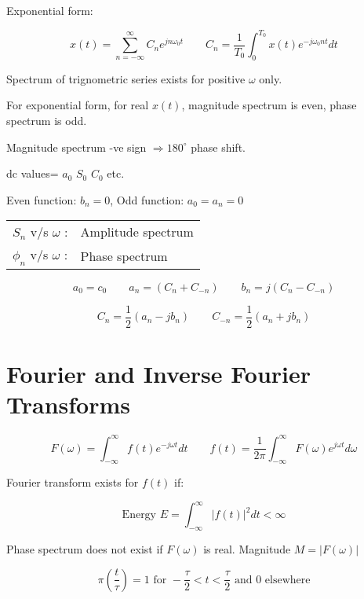 \documentclass[a4paper]{article}
\begin{document}
Exponential form:

\begin{displaymath}
x(t)=
\sum_{n=-\infty}^\infty C_n e^{jn\omega_0 t}
\qquad
C_n=
\frac{1}{T_0}
\int_0^{T_0} x(t) e^{-j\omega_0 nt} dt
\end{displaymath}


Spectrum of trignometric series exists for positive $\omega$ only.

For exponential form, for real $x(t)$, magnitude spectrum is even, phase
spectrum is odd.

Magnitude spectrum -ve sign $\Rightarrow180^\circ$ phase shift.

dc values= $a_0$ $S_0$ $C_0$ etc.

Even function: $b_n=0$,  Odd function: $a_0=a_n=0$

\begin{tabular}{l l}
$S_n$ v/s $\omega$ :    & Amplitude spectrum\\
$\phi_n$ v/s $\omega$ : & Phase spectrum\\
\end{tabular}


\begin{displaymath}
a_0=c_0
\qquad
a_n=(C_n + C_{-n})
\qquad
b_n=j(C_n - C_{-n})
\end{displaymath}

\begin{displaymath}
C_n=\frac{1}{2}(a_n - jb_n)
\qquad
C_{-n}=\frac{1}{2}(a_n + jb_n)
\end{displaymath}


\section{Fourier and Inverse Fourier Transforms}

\begin{displaymath}
F(\omega)=\int_{-\infty}^{\infty} f(t) e^{-j\omega t} dt
\qquad
f(t)=\frac{1}{2\pi} \int_{-\infty}^{\infty} F(\omega) e^{j\omega t}d\omega
\end{displaymath}

Fourier transform exists for $f(t)$ if:

\begin{displaymath}
\textrm{Energy } E = \int_{-\infty}^{\infty} |f(t)|^2 dt < \infty
\end{displaymath}

Phase spectrum does not exist if $F(\omega)$ is
real. Magnitude $M=|F(\omega)|$

\begin{displaymath}
\pi(\frac{t}{\tau})=
1 \textrm{ for }
-\frac{\tau}{2}
< t <
\frac{\tau}{2}
\textrm{ and 0 elsewhere}
\end{displaymath}
\end{document}
